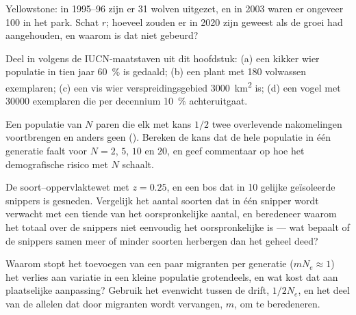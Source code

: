 \begin{exercise}[$\star\star$]\label{exo:b3:conservation-biology:8}
Yellowstone: in 1995--96 zijn er 31 wolven uitgezet, en in 2003 waren
er ongeveer 100 in het park. Schat $r$; hoeveel zouden er in 2020 zijn
geweest als de groei had aangehouden, en waarom is dat niet gebeurd?
\end{exercise}

\begin{exercise}[$\star\star$]\label{exo:b3:conservation-biology:9}
Deel in volgens de IUCN-maatstaven uit dit hoofdstuk: (a) een kikker
wier populatie in tien jaar \qty{60}{\%} is gedaald; (b) een plant met
180 volwassen exemplaren; (c) een vis wier verspreidingsgebied
\qty{3000}{km^2} is; (d) een vogel met \num{30000} exemplaren die per
decennium \qty{10}{\%} achteruitgaat.
\end{exercise}

\begin{exercise}[$\star\star\star$]\label{exo:b3:conservation-biology:10}
Een populatie van $N$ paren die elk met kans $1/2$ twee overlevende
nakomelingen voortbrengen en anders geen ().
Bereken de kans dat de hele populatie in één generatie faalt voor
$N = 2$, $5$, $10$ en $20$, en geef commentaar op hoe het demografische
risico met $N$ schaalt.
\end{exercise}

\begin{exercise}[$\star\star\star$]\label{exo:b3:conservation-biology:11}
De soort--oppervlaktewet met $z = 0.25$, en een bos dat in 10 gelijke
geïsoleerde snippers is gesneden. Vergelijk het aantal soorten dat in
één snipper wordt verwacht met een tiende van het oorspronkelijke
aantal, en beredeneer waarom het totaal over de snippers niet
eenvoudig het oorspronkelijke is --- wat bepaalt of de snippers samen
meer of minder soorten herbergen dan het geheel deed?
\end{exercise}

\begin{exercise}[$\star\star\star$]\label{exo:b3:conservation-biology:12}
Waarom stopt het toevoegen van een paar migranten per generatie
($m N_{e} \approx 1$) het verlies aan variatie in een kleine populatie
grotendeels, en wat kost dat aan plaatselijke aanpassing? Gebruik het
evenwicht tussen de drift, $1/2N_{e}$, en het deel van de allelen dat
door migranten wordt vervangen, $m$, om te beredeneren.
\end{exercise}

